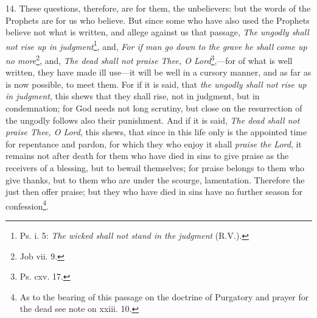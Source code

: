 14. These questions, therefore, are for them, the unbelievers: but the words of the Prophets are for us who believe. But since some who have also used the Prophets believe not what is written, and allege against us that passage, \emph{The ungodly shall not rise up in judgment}\footnote{Ps. i. 5: \emph{The wicked shall not stand in the judgment} (\textsc{R.V.}).}, and, \emph{For if man go down to the grave he shall come up no more}\footnote{Job vii. 9.}, and, \emph{The dead shall not praise Thee, O Lord}\footnote{Ps. cxv. 17.},—for of what is well written, they have made ill use—it will be well in a cursory manner, and as far as is now possible, to meet them. For if it is said, that \emph{the ungodly shall not rise up in judgment}, this shews that they shall rise, not in judgment, but in condemnation; for God needs not long scrutiny, but close on the resurrection of the ungodly follows also their punishment. And if it is said, \emph{The dead shall not praise Thee, O Lord}, this shews, that since in this life only is the appointed time for repentance and pardon, for which they who enjoy it shall \emph{praise the Lord}, it remains not after death for them who have died in sins to give praise as the receivers of a blessing, but to bewail themselves; for praise belongs to them who give thanks, but to them who are under the scourge, lamentation. Therefore the just then offer praise; but they who have died in sins have no further season for confession\footnote{As to the bearing of this passage on the doctrine of Purgatory and prayer for the dead see note on xxiii. 10.}.

